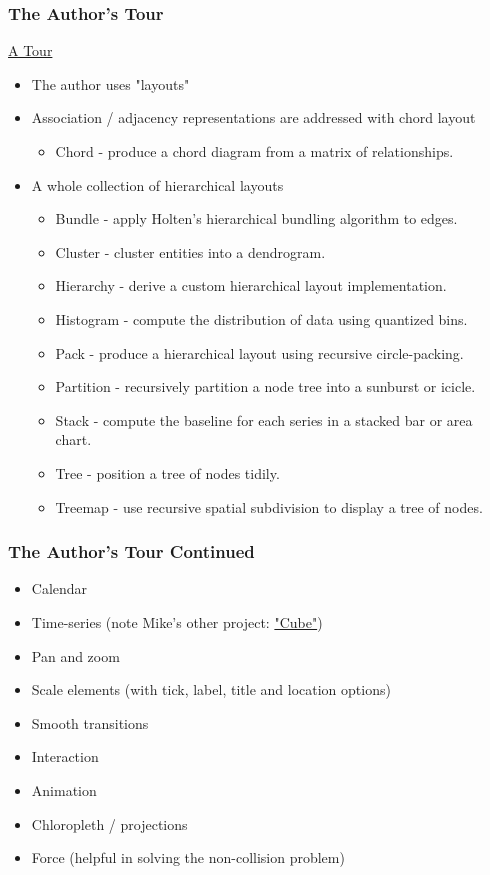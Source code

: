 \documentclass{beamer}
\begin{document}
\begin{frame}
\frametitle{The Author's Tour}
\href{http://mbostock.github.com/d3/talk/20111018/\#0}{A Tour}
\begin{itemize}
\item The author uses "layouts"
\item Association / adjacency representations are addressed with chord layout
    \begin{itemize}
    \item Chord - produce a chord diagram from a matrix of relationships.
    \end{itemize}
\item A whole collection of hierarchical layouts 
    \begin{itemize}
    \item Bundle - apply Holten's hierarchical bundling algorithm to edges.
    \item Cluster - cluster entities into a dendrogram.
    \item Hierarchy - derive a custom hierarchical layout implementation.
    \item Histogram - compute the distribution of data using quantized bins.
    \item Pack - produce a hierarchical layout using recursive circle-packing.
    \item Partition - recursively partition a node tree into a sunburst or icicle.
    \item Stack - compute the baseline for each series in a stacked bar or area chart.
    \item Tree - position a tree of nodes tidily.
    \item Treemap - use recursive spatial subdivision to display a tree of nodes.
    \end{itemize}
\end{itemize}
\end{frame}



\begin{frame}
\frametitle{The Author's Tour Continued}
\begin{itemize}
\item Calendar
\item Time-series (note Mike's other project: \href{https://github.com/square/cube}{"Cube"})
\item Pan and zoom 
\item Scale elements (with tick, label, title and location options)
\item Smooth transitions
\item Interaction 
\item Animation
\item Chloropleth / projections
\item Force (helpful in solving the non-collision problem)
\end{itemize}
\end{frame}
\end{document}
